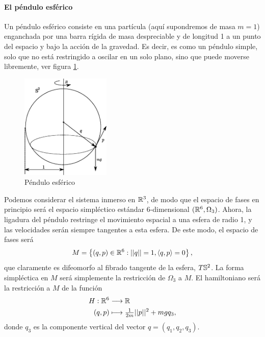    \paragraph{\bf El péndulo esférico}\mbox{}

   Un péndulo esférico consiste en una partícula (aquí supondremos de masa $m=1$) enganchada por una barra rígida de masa despreciable y de longitud 1 a un punto del espacio y bajo la acción de la gravedad. Es decir, es como un péndulo simple, solo que no está restringido a oscilar en un solo plano, sino que puede moverse libremente, ver figura \ref{fig:espendulo}.
\begin{figure}[h]
  \centering
  \includegraphics[width=0.38\textwidth]{pics/espendulo.eps}
  \caption{\small Péndulo esférico}
  \label{fig:espendulo}
\end{figure}

Podemos considerar el sistema inmerso en $\mathbb{R}^3$, de modo que el espacio de fases en principio será el espacio simpléctico estándar $6$-dimensional $(\mathbb{R}^6,\Omega_3)$. Ahora, la ligadura del péndulo restringe el movimiento espacial a una esfera de radio 1, y las velocidades serán siempre tangentes a esta esfera. De este modo, el espacio de fases será
\begin{equation*}
  M=\left\{ (q,p)\in \mathbb{R}^6 : ||q||=1, \left\langle q,p\right\rangle=0 \right\},
\end{equation*}
que claramente es difeomorfo al fibrado tangente de la esfera, $T\mathbb{S}^2$. La forma simpléctica en $M$ será simplemente la restricción de $\Omega_3$ a $M$. El hamiltoniano será la restricción a $M$ de la función 
\begin{align*}
  H :\mathbb{R}^6&\longrightarrow \mathbb{R}\\ 
  (q,p) &\longmapsto \tfrac{1}{2m}||p||^2+mgq_3, 
  \end{align*}
  donde $q_3$ es la componente vertical del vector $q=(q_1,q_2,q_3)$.

